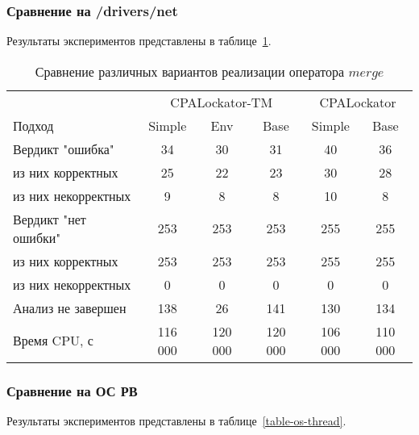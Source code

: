 
\subsubsection{Сравнение на /drivers/net}
Результаты экспериментов представлены в таблице~\ref{table-drivers-thread}.

\begin{center}
  \begin{table}[h]\footnotesize \centering
  	\label{table-drivers-thread}
    \caption{Сравнение различных вариантов реализации оператора $merge$}
    \begin{tabular}{ | l | c | c | c | c | c |}
      \hline
      					& \multicolumn{3}{|c|}{CPALockator-TM} 			& \multicolumn{2}{|c|}{CPALockator} 	\\
      Подход         				& Simple 	& Env 		& Base 		& Simple 	& Base  	\\ \hline
      Вердикт "ошибка" 				& 34    	& 30   		& 31   		& 40        & 36  	 	\\ 
  \hspace{0.5cm} из них корректных 	& 25 		& 22 		& 23   		& 30       	& 28   		\\ 
  \hspace{0.5cm} из них некорректных & 9 		& 8 		& 8   		& 10       	& 8     	\\ \hline
      Вердикт "нет ошибки"  		& 253      	& 253    	& 253    	& 255      	& 255     	\\ 
  \hspace{0.5cm} из них корректных 	& 253 		& 253    	& 253    	& 255       & 255   	\\
  \hspace{0.5cm} из них некорректных & 0 		& 0    		& 0     	& 0         & 0   		\\ \hline
      Анализ не завершен       		& 138     	& 26    	& 141    	& 130      	& 134   	\\ \hline
      Время CPU, с   				& 116 000 	& 120 000 	& 120 000 	& 106 000  	& 110 000   \\ 
      \hline
    \end{tabular}
  \end{table}
\end{center}

\subsubsection{Сравнение на ОС РВ}
Результаты экспериментов представлены в таблице~\ref{table-os-thread}.

